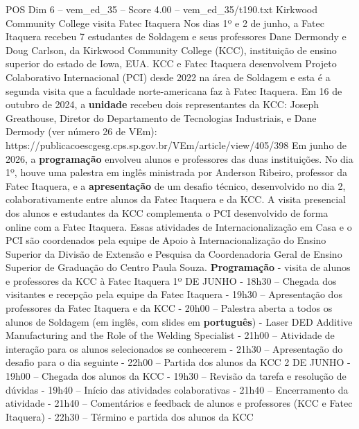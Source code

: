 \begin{textsample}{POS Dim 6 – vem\_ed\_35 – Score 4.00 – vem\_ed\_35/t190.txt}  \label{ex:f6_pos_151}
Kirkwood Community College visita Fatec Itaquera Nos dias 1º e 2 de junho, a Fatec Itaquera recebeu 7 estudantes de Soldagem e seus professores Dane Dermondy e Doug Carlson, da Kirkwood Community College (KCC), instituição de ensino superior do estado de Iowa, EUA.
KCC e Fatec Itaquera desenvolvem Projeto Colaborativo Internacional (PCI) desde 2022 na área de Soldagem e esta é a segunda visita que a faculdade norte-americana faz à Fatec Itaquera.
Em 16 de outubro de 2024, a \textbf{unidade} recebeu dois representantes da KCC: Joseph Greathouse, Diretor do Departamento de Tecnologias Industriais, e Dane Dermody (ver número 26 de VEm): https://publicacoescgesg.cps.sp.gov.br/VEm/article/view/405/398 Em junho de 2026, a \textbf{programação} envolveu alunos e professores das duas instituições.
No dia 1º, houve uma palestra em inglês ministrada por Anderson Ribeiro, professor da Fatec Itaquera, e a \textbf{apresentação} de um desafio técnico, desenvolvido no dia 2, colaborativamente entre alunos da Fatec Itaquera e da KCC.
A visita presencial dos alunos e estudantes da KCC complementa o PCI desenvolvido de forma online com a Fatec Itaquera.
Essas atividades de Internacionalização em Casa e o PCI são coordenados pela equipe de Apoio à Internacionalização do Ensino Superior da Divisão de Extensão e Pesquisa da Coordenadoria Geral de Ensino Superior de Graduação do Centro Paula Souza. \textbf{Programação} - visita de alunos e professores da KCC à Fatec Itaquera 1º DE JUNHO - 18h30 – Chegada dos visitantes e recepção pela equipe da Fatec Itaquera - 19h30 – Apresentação dos professores da Fatec Itaquera e da KCC - 20h00 – Palestra aberta a todos os alunos de Soldagem (em inglês, com slides em \textbf{português}) - Laser DED Additive Manufacturing and the Role of the Welding Specialist - 21h00 – Atividade de interação para os alunos selecionados se conhecerem - 21h30 – Apresentação do desafio para o dia seguinte - 22h00 – Partida dos alunos da KCC 2 DE JUNHO - 19h00 – Chegada dos alunos da KCC - 19h30 – Revisão da tarefa e resolução de dúvidas - 19h40 – Início das atividades colaborativas - 21h40 – Encerramento da atividade - 21h40 – Comentários e feedback de alunos e professores (KCC e Fatec Itaquera) - 22h30 – Término e partida dos alunos da KCC

\end{textsample}
